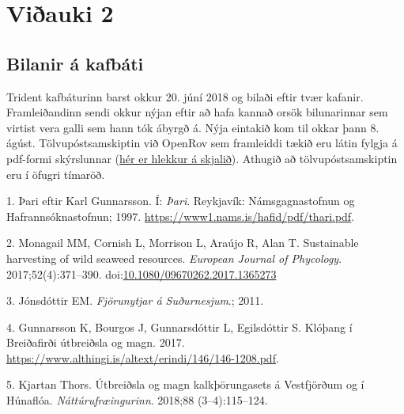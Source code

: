 \documentclass[icelandic,]{book}
\begin{document}
\hypertarget{v2}{%
\chapter{Viðauki 2}\label{v2}}

\hypertarget{bilanir-a-kafbati}{%
\section{Bilanir á kafbáti}\label{bilanir-a-kafbati}}

Trident kafbáturinn barst okkur 20. júní 2018 og bilaði eftir tvær kafanir. Framleiðandinn sendi okkur nýjan eftir að hafa kannað orsök bilunarinnar sem virtist vera galli sem hann tók ábyrgð á. Nýja eintakið kom til okkar þann 8. ágúst. Tölvupóstsamskiptin við OpenRov sem framleiddi tækið eru látin fylgja á pdf-formi skýrslunnar (\href{https://github.com/harkanatta/ssnv_trident/blob/master/skjol/bilanir.pdf}{hér er hlekkur á skjalið}). Athugið að tölvupóstsamskiptin eru í öfugri tímaröð.


\hypertarget{refs}{}
\leavevmode\hypertarget{ref-karl1997}{}%
1. Þari eftir Karl Gunnarsson. Í: \emph{Þari}. Reykjavík: Námsgagnastofnun og Hafrannsóknastofnun; 1997. \url{https://www1.nams.is/hafid/pdf/thari.pdf}.

\leavevmode\hypertarget{ref-Monagail2017}{}%
2. Monagail MM, Cornish L, Morrison L, Araújo R, Alan T. Sustainable harvesting of wild seaweed resources. \emph{European Journal of Phycology}. 2017;52(4):371--390. doi:\href{https://doi.org/10.1080/09670262.2017.1365273}{10.1080/09670262.2017.1365273}

\leavevmode\hypertarget{ref-Jonsdottir2011}{}%
3. Jónsdóttir EM. \emph{Fjörunytjar á Suðurnesjum}.; 2011.

\leavevmode\hypertarget{ref-Gunnarsson2017}{}%
4. Gunnarsson K, Bourgos J, Gunnarsdóttir L, Egilsdóttir S. Klóþang í Breiðafirði útbreiðsla og magn. 2017. \url{https://www.althingi.is/altext/erindi/146/146-1208.pdf}.

\leavevmode\hypertarget{ref-thors}{}%
5. Kjartan Thors. Útbreiðsla og magn kalkþörungasets á Vestfjörðum og í Húnaflóa. \emph{Náttúrufræingurinn}. 2018;88 (3--4):115--124.
\end{document}

